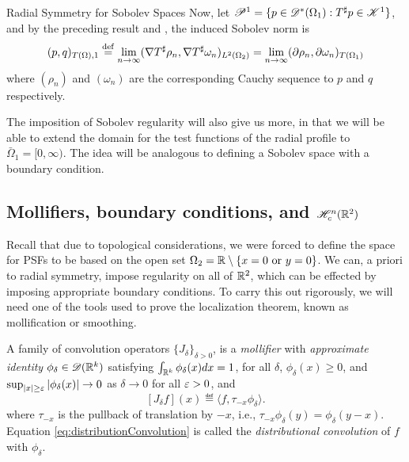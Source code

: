 \begin{chapter}{Radial Symmetry for Sobolev Spaces}
Now, let $\mathscr P^1 = \{p \in \mathscr D^*(\Omega_1): T^\sharp p \in \mathscr K^1\}$, and by the preceding result  and , the induced Sobolev norm is
\begin{equation}
  (p,q)_{T(\Omega),1} \stackrel{\rm def}{=} \lim_{n\to \infty} (\nabla T^\sharp \rho_n, \nabla T^\sharp \omega_n)_{L^2(\Omega_2)} = \lim_{n\to \infty} (\partial \rho_n,\partial \omega_n)_{T(\Omega_1)}
\end{equation}
where $(\rho_n)$ and $(\omega_n)$ are the corresponding Cauchy sequence to $p$ and $q$ respectively.

The imposition of Sobolev regularity will also give us more, in that we will be able to extend the domain for the test functions of the radial profile to $\bar\Omega_1 = [0,\infty)$.
The idea will be analogous to defining a Sobolev space with a boundary condition.

\subsection{Mollifiers, boundary conditions, and $\mathscr H_c^n(\mathbb R^2)$}

Recall that due to topological considerations, we were forced to define the space for PSFs to be based on the open set $\Omega_2 = \mathbb R\setminus \{x=0\text{ or }y=0\}$. 
We can, a priori to radial symmetry, impose regularity on all of $\mathbb R^2$, which can be effected by imposing appropriate boundary conditions.
To carry this out rigorously, we will need one of the tools used to prove the localization theorem, known as mollification or smoothing.

A family of convolution operators $\{J_\delta\}_{\delta>0}$, is a \emph{mollifier} with \emph{approximate identity} $\phi_\delta \in \mathscr D(\mathbb R^k)$ satisfying $\int_{\mathbb R^k} \phi_\delta(x)dx = 1$, for all $\delta$, $\phi_\delta(x) \ge 0$, and $\sup_{|x|\ge\varepsilon}|\phi_\delta(x)|\to0$ as $\delta\to 0$ for all $\varepsilon >0$, and
\begin{equation} \label{eq:distributionConvolution}
  [J_\delta f](x) \eqdef \langle f, \tau_{-x}\phi_\delta\rangle.
\end{equation}
where $\tau_{-x}$ is the pullback of translation by $-x$, i.e., $\tau_{-x}\phi_\delta(y) = \phi_\delta(y-x)$.
Equation \eqref{eq:distributionConvolution} is called the \emph{distributional convolution} of $f$ with $\phi_\delta$.


\end{chapter}

